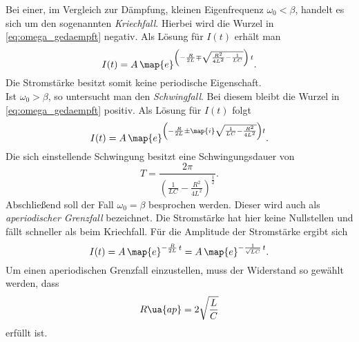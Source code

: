 Bei einer, im Vergleich zur Dämpfung, kleinen Eigenfrequenz $\omega_0<\beta$,
handelt es sich um den sogenannten \emph{Kriechfall}. %
Hierbei wird die Wurzel in \eqref{eq:omega_gedaempft} negativ. Als Lösung für
$I(t)$ erhält man
\begin{equation*}
     I(t)=A\,\map{e}^{\left(-\frac{R}{2L}\mp\sqrt{\frac{R^2}{4L^2}-\frac{1}{LC}}\right)\,t}.
\end{equation*}
Die Stromstärke besitzt somit keine periodische Eigenschaft.
\\
Ist $\omega_0>\beta$, so untersucht man den \emph{Schwingfall}. %
Bei diesem bleibt die Wurzel in \eqref{eq:omega_gedaempft} positiv. Als
Lösung für $I(t)$ folgt
\begin{equation*}
  I(t)=A\,\map{e}^{\left(-\frac{R}{2L}\pm\map{i}\sqrt{{\frac{1}{LC}}-\frac{R^2}{4L^2}}\right)t}.
\end{equation*}
Die sich einstellende Schwingung besitzt eine Schwingungsdauer von
\begin{equation}
  \label{eq:schwingungsdauer_schwingfall}
  T=\frac{2\pi}{\left(\frac{1}{LC}-\frac{R^2}{4L^2}\right)^{\frac{1}{2}}}.
\end{equation}
Abschließend soll der Fall $\omega_0=\beta$ besprochen werden.
Dieser wird auch als \emph{aperiodischer Grenzfall} bezeichnet.
Die Stromstärke hat hier keine Nullstellen und fällt schneller als
beim Kriechfall.
Für die Amplitude der Stromstärke ergibt sich
\begin{equation}
  \label{eq:ap_grenz}
  I(t)=A\,\map{e}^{-\frac{R}{2L}\,t}=A\,\map{e}^{-\frac{1}{\sqrt{LC}}\,t}.
\end{equation}
Um einen aperiodischen Grenzfall einzustellen, muss der Widerstand so gewählt werden,
dass
\begin{equation}
  \label{eq:widerstand_aperiodischer_grenzfall}
  R\ua{ap}=2\sqrt{\frac{L}{C}}
\end{equation}
erfüllt ist.
